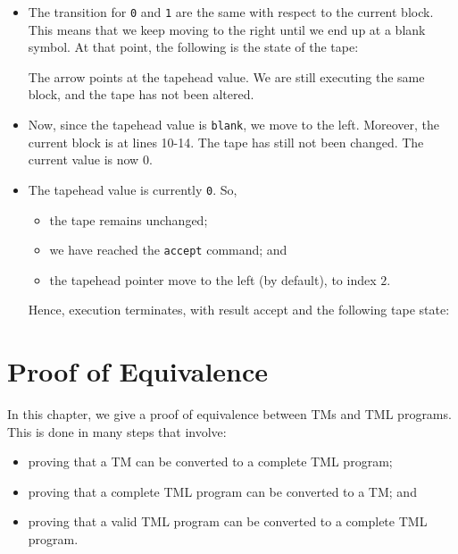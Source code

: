 \begin{appendices}
\begin{itemize}
    \item The transition for \texttt{0} and \texttt{1} are the same with respect to the current block. This means that we keep moving to the right until we end up at a blank symbol. At that point, the following is the state of the tape:
    \begin{figure}[H]
        \centering
    \end{figure}
    The arrow points at the tapehead value. We are still executing the same block, and the tape has not been altered.
    
    \item Now, since the tapehead value is \texttt{blank}, we move to the left. Moreover, the current block is at lines 10-14. The tape has still not been changed. The current value is now $0$.

    \item The tapehead value is currently \texttt{0}. So,  
    \begin{itemize}
        \item the tape remains unchanged;
        \item we have reached the \texttt{accept} command; and
        \item the tapehead pointer move to the left (by default), to index $2$.
    \end{itemize}
    Hence, execution terminates, with result accept and the following tape state:
    \begin{figure}[H]
        \centering
    \end{figure}
\end{itemize}

\chapter{Proof of Equivalence}
In this chapter, we give a proof of equivalence between TMs and TML programs. This is done in many steps that involve:
\begin{itemize}
    \item proving that a TM can be converted to a complete TML program;
    \item proving that a complete TML program can be converted to a TM; and
    \item proving that a valid TML program can be converted to a complete TML program.
\end{itemize}


\end{appendices}
